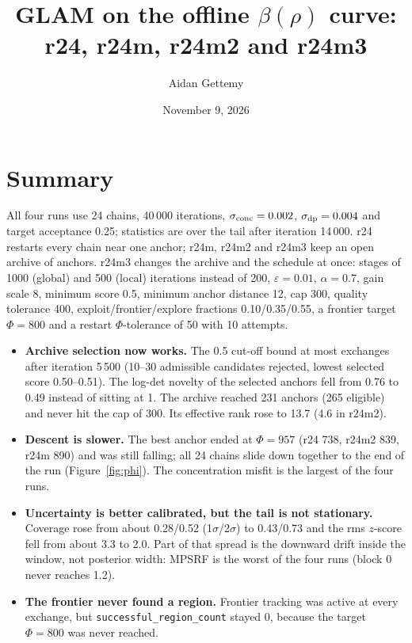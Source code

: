 \documentclass[11pt]{article}
\title{GLAM on the offline $\beta(\rho)$ curve:\\ r24, r24m, r24m2 and r24m3}
\author{Aidan Gettemy}
\date{November 9, 2026}
\begin{document}
\maketitle

\section{Summary}
All four runs use 24 chains, 40\,000 iterations, $\sigma_{\rm conc}=0.002$, $\sigma_{\rm dp}=0.004$ and target acceptance 0.25; statistics are over the tail after iteration 14\,000. r24 restarts every chain near one anchor; r24m, r24m2 and r24m3 keep an open archive of anchors. r24m3 changes the archive and the schedule at once: stages of 1000 (global) and 500 (local) iterations instead of 200, $\varepsilon=0.01$, $\alpha=0.7$, gain scale 8, minimum score 0.5, minimum anchor distance 12, cap 300, quality tolerance 400, exploit/frontier/explore fractions 0.10/0.35/0.55, a frontier target $\Phi=800$ and a restart $\Phi$-tolerance of 50 with 10 attempts.
\begin{itemize}
\item \textbf{Archive selection now works.} The 0.5 cut-off bound at most exchanges after iteration 5\,500 (10--30 admissible candidates rejected, lowest selected score 0.50--0.51). The log-det novelty of the selected anchors fell from 0.76 to 0.49 instead of sitting at 1. The archive reached 231 anchors (265 eligible) and never hit the cap of 300. Its effective rank rose to 13.7 (4.6 in r24m2).
\item \textbf{Descent is slower.} The best anchor ended at $\Phi=957$ (r24 738, r24m2 839, r24m 890) and was still falling; all 24 chains slide down together to the end of the run (Figure~\ref{fig:phi}). The concentration misfit is the largest of the four runs.
\item \textbf{Uncertainty is better calibrated, but the tail is not stationary.} Coverage rose from about 0.28/0.52 (1$\sigma$/2$\sigma$) to 0.43/0.73 and the rms $z$-score fell from about 3.3 to 2.0. Part of that spread is the downward drift inside the window, not posterior width: MPSRF is the worst of the four runs (block 0 never reaches 1.2).
\item \textbf{The frontier never found a region.} Frontier tracking was active at every exchange, but \texttt{successful\_region\_count} stayed 0, because the target $\Phi=800$ was never reached.
\end{itemize}
\end{document}
